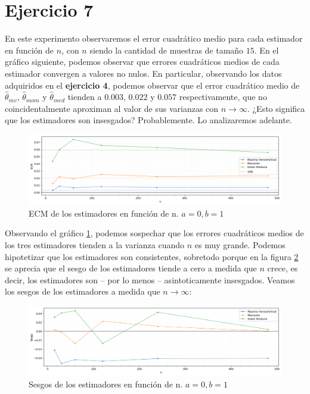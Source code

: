 \section{Ejercicio 7}
En este experimento observaremos el error cuadrático medio para cada estimador en función de $n$, con $n$ siendo la cantidad de muestras de tamaño $15$. En el gráfico siguiente, podemos observar que errores cuadráticos medios de cada estimador convergen a valores no nulos. En particular, observando los datos adquiridos en el \textbf{ejercicio 4}, podemos observar que el error cuadrático medio de $\hat{\theta}_{mv}$, $\hat{\theta}_{mom}$ y $\hat{\theta}_{med}$ tienden a $0.003$, $0.022$ y $0.057$ respectivamente, que no coincidentalmente aproximan al valor de sus varianzas con $n \rightarrow \infty$. ¿Esto significa que los estimadores son insesgados? Probablemente. Lo analizaremos adelante.

\begin{figure}[H]
	\centering
	\includegraphics[width=1\textwidth]{imagenes/ecm-en-f-de-n.png}
	\caption{\footnotesize ECM de los estimadores en función de n. $a=0, b=1$}
	\label{fig:ej7-ecm-en-f-de-n}
\end{figure}

Observando el gráfico \ref{fig:ej7-ecm-en-f-de-n}, podemos sospechar que los errores cuadráticos medios de los tres estimadores tienden a la varianza cuando $n$ es muy grande. Podemos hipotetizar que los estimadores son consistentes, sobretodo porque en la figura \ref{fig:ej7-sesgos-en-f-de-n} se aprecia que el sesgo de los estimadores tiende a cero a medida que $n$ crece, es decir, los estimadores son – por lo menos – asintoticamente insesgados. Veamos los sesgos de los estimadores a medida que $n \rightarrow \infty$:

\begin{figure}[H]
	\centering
	\includegraphics[width=1\textwidth]{imagenes/sesgos-en-f-de-n.png}
	\caption{\footnotesize Sesgos de los estimadores en función de n. $a=0, b=1$}
	\label{fig:ej7-sesgos-en-f-de-n}
\end{figure}

